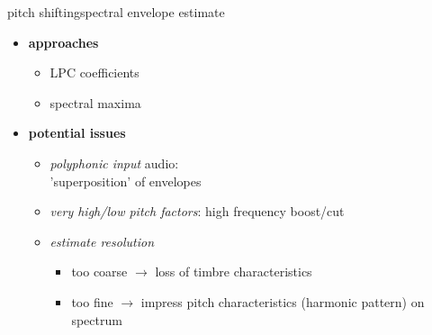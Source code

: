         \begin{frame}{pitch shifting}{spectral envelope estimate}
            \begin{itemize}
                \item   \textbf{approaches}
                    \begin{itemize}
                        \item   LPC coefficients
                        \item   spectral maxima
                    \end{itemize}
                \pause
                \bigskip
                \item   \textbf{potential issues}
                    \begin{itemize}
                        \item   \textit{polyphonic input} audio:\\ 'superposition' of envelopes
                        \item   \textit{very high/low pitch factors}: high frequency boost/cut
                        \item   \textit{estimate resolution}
                            \begin{itemize}
                                \item   too coarse $\rightarrow$ loss of timbre characteristics
                                \item   too fine $\rightarrow$ impress pitch characteristics (harmonic pattern) on spectrum
                            \end{itemize}
                    \end{itemize}
            \end{itemize}
        \end{frame}
